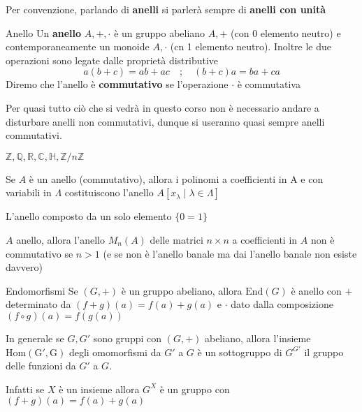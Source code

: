 Per convenzione, parlando di \textbf{anelli} si parlerà sempre di \textbf{anelli
con unità}
\begin{definition}{Anello}
    Un \textbf{anello} \(A, +, \cdot \) è un gruppo abeliano \(A, +\) (con 0
    elemento neutro) e
    contemporaneamente un monoide \(A, \cdot \)  (cn 1 elemento neutro).
    Inoltre le due operazioni sono legate dalle proprietà distributive 
    \[
      a{(b + c)} = ab + ac \quad ; \quad {(b + c)}a = ba + ca
    \]
    Diremo che l'anello è \textbf{commutativo} se l'operazione \(\cdot \) è
    commutativa
\end{definition}
Per quasi tutto ciò che si vedrà in questo corso non è necessario andare a
disturbare anelli non commutativi, dunque si useranno quasi sempre anelli
commutativi.
\begin{example}
    \(\mathbb{Z}, \mathbb{Q}, \mathbb{R}, \mathbb{C}, \mathbb{H}, \mathbb{Z} / n \mathbb{Z}\)
\end{example}
\begin{example}
    Se \(A\) è un anello (commutativo), allora i polinomi a coefficienti in A e
    con variabili in \(\Lambda\) costituiscono l'anello \(A[x_{\lambda} \mid
    \lambda \in  \Lambda]\) 
\end{example}
\begin{example}
    L'anello composto da un solo elemento \(\{0 = 1\} \)  
\end{example}
\begin{example}
    \(A\) anello, allora l'anello \(M_{n}{(A)}\) delle matrici \(n \times n\) a
    coefficienti in \(A\) non è commutativo se \(n > 1\) (e se non è l'anello
    banale ma dai l'anello banale non esiste davvero)
\end{example}
\begin{example}{Endomorfismi}
    Se \({(G, +)}\) è un gruppo abeliano, allora \(\mathrm{End}{(G)}\) è anello
    con \(+\) determinato da \({(f + g)}{(a)} = f{(a)} + g{(a)}\) e \(\cdot \)
    dato dalla composizione \({(f \circ g)}{(a)} = f{(g{(a)})}\) 

    In generale se \(G, G'\) sono gruppi con \({(G, +)}\) abeliano, allora l'insieme
    \(\mathrm{Hom {(G', G)}}\) degli omomorfismi da \(G'\) a \(G\)  è un sottogruppo
    di \(G^{G'}\) il gruppo delle funzioni da \(G'\) a \(G\).

    Infatti se \(X\) è un insieme allora \(G^{X}\) è un gruppo con \({(f + g)}{(a)} = f{(a)} + g{(a)}\) 
\end{example}

